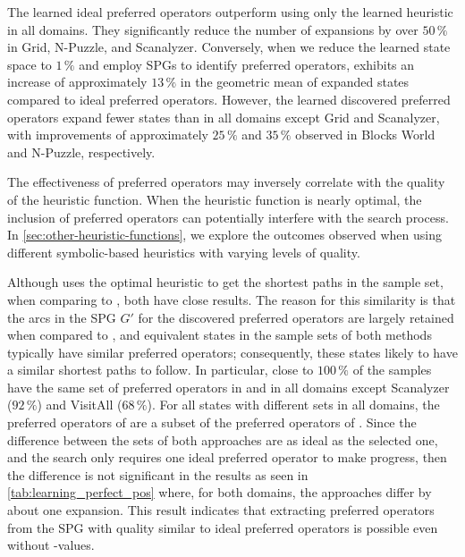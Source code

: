 \documentclass[ppgc,diss,english]{iiufrgs}
\begin{document}
The learned ideal preferred operators \postar outperform using only the learned heuristic \hnn in all domains. They significantly reduce the number of expansions by over $50\,\%$ in Grid, N-Puzzle, and Scanalyzer. Conversely, when we reduce the learned state space to $1\,\%$ and employ SPGs to identify preferred operators, \pog exhibits an increase of approximately $13\,\%$ in the geometric mean of expanded states compared to ideal preferred operators. However, the learned discovered preferred operators \pog expand fewer states than \hnn in all domains except Grid and Scanalyzer, with improvements of approximately $25\,\%$ and $35\,\%$ observed in Blocks World and N-Puzzle, respectively.

The effectiveness of preferred operators may inversely correlate with the quality of the heuristic function. When the heuristic function is nearly optimal, the inclusion of preferred operators can potentially interfere with the search process. In \cref{sec:other-heuristic-functions}, we explore the outcomes observed when using different symbolic-based heuristics with varying levels of quality.

Although \pogstar uses the optimal heuristic \hstar to get the shortest paths in the sample set, when comparing to \pog, both have close results. The reason for this similarity is that the arcs in the SPG $G'$ for the discovered preferred operators \pog are largely retained when compared to \pogstar, and equivalent states in the sample sets of both methods typically have similar preferred operators; consequently, these states likely to have a similar shortest paths to follow. In particular, close to $100\,\%$ of the samples have the same set of preferred operators in \pogstar and \pog in all domains except Scanalyzer ($92\,\%$) and VisitAll ($68\,\%$). For all states with different sets in all domains, the preferred operators of \pog are a subset of the preferred operators of \pogstar. Since the difference between the sets of both approaches are as ideal as the selected one, and the search only requires one ideal preferred operator to make progress, then the difference is not significant in the results as seen in \cref{tab:learning_perfect_pos} where, for both domains, the approaches differ by about one expansion. This result indicates that extracting preferred operators from the SPG with quality similar to ideal preferred operators is possible even without \hstar-values.
\end{document}
